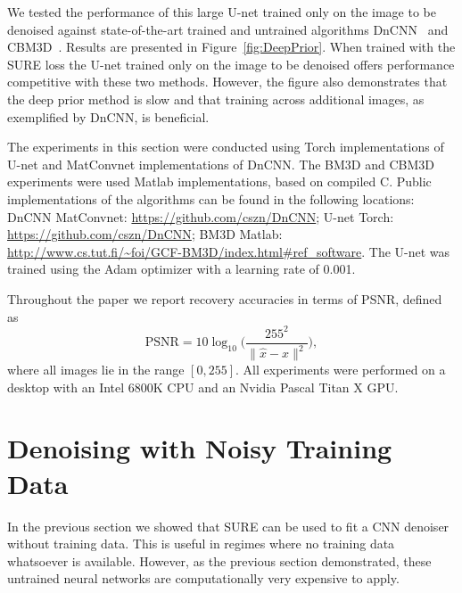 \documentclass{article}
\begin{document}
We tested the performance of this large U-net trained only on the image to be denoised against state-of-the-art trained and untrained algorithms DnCNN~\cite{DnCNN} and CBM3D~\cite{BM3D}. Results are presented in Figure~\ref{fig:DeepPrior}. When trained with the SURE loss the U-net trained only on the image to be denoised offers performance competitive with these two methods. However, the figure also demonstrates that the deep prior method is slow and that training across additional images, as exemplified by DnCNN, is beneficial.

The experiments in this section were conducted using Torch implementations of U-net and MatConvnet implementations of DnCNN. 
The BM3D and CBM3D experiments were used Matlab implementations, based on compiled C. Public implementations of the algorithms can be found in the following locations:
DnCNN MatConvnet: \url{https://github.com/cszn/DnCNN};
U-net Torch: \url{https://github.com/cszn/DnCNN};
BM3D Matlab: \url{http://www.cs.tut.fi/~foi/GCF-BM3D/index.html#ref_software}.
The U-net was trained using the Adam optimizer \cite{ADAMopt} with a learning rate of 0.001.

Throughout the paper we report recovery accuracies in terms of PSNR, defined as 
\[
\text{PSNR}=10\log_{10}\bigg(\frac{255^2}{\|\hat{x}-x\|^2}\bigg),
\]
where all images lie in the range $[0,255]$. 
All experiments were performed on a desktop with an Intel 6800K CPU and an Nvidia Pascal Titan X GPU.

\section{Denoising with Noisy Training Data}\label{sec:Denoising}

In the previous section we showed that SURE can be used to fit a CNN denoiser without training data. This is useful in regimes where no training data whatsoever is available. However, as the previous section demonstrated, these untrained neural networks are computationally very expensive to apply.
\end{document}
